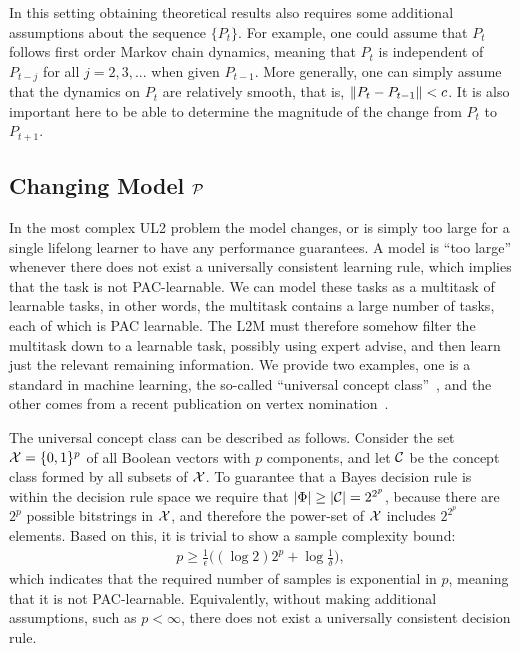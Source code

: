 \documentclass{article}
\begin{document}
In this setting obtaining theoretical results also requires some additional assumptions about the sequence $\{P_t\}$.
For example, one could assume that $P_t$ follows  first order Markov chain dynamics, meaning that $P_t$ is independent of $P_{t-j}$  for all $j=2,3,...$ when given $P_{t-1}$.  More generally, one can simply assume that the dynamics on $P_t$ are relatively smooth, that is, $\left \lVert P_t - P_{t-1} \right \rVert < c$. It is also important here to be able to determine the magnitude of the change from $P_t$ to $P_{t+1}$. 



\subsection{Changing Model $\mathcal{P}$}

In the most complex  UL2 problem  the model changes, or is simply too large for a single lifelong learner to have any performance guarantees. A model is ``too large'' whenever there does not exist a universally consistent learning rule, which implies that the task is not PAC-learnable. We can model these tasks as a multitask of learnable tasks, in other words, the multitask contains a large number of tasks, each of which is PAC learnable.  The L2M must therefore somehow filter the multitask down to a learnable task, possibly using expert advise, and then learn just the relevant remaining information.  We provide two examples, one is a standard in machine learning, the so-called ``universal concept class''~\cite{Mohri2018-tf}, and the other comes from a recent publication on vertex nomination~\cite{Lyzinski2017}.  

The universal concept class can be described as follows.  Consider the set $\mathcal{X}=\{0,1\}^p$ of all Boolean vectors with $p$ components, and let $\mathcal{C}$ be the concept class formed by all subsets of $\mathcal{X}$.  To guarantee that a Bayes decision rule is within the decision rule space we require that $|\Phi| \geq |\mathcal{C}| = 2^{2^p}$, because there are $2^p$ possible bitstrings in $\mathcal{X}$, and therefore the power-set of $\mathcal{X}$ includes $2^{2^p}$ elements.  Based on this, it is trivial to show a sample complexity bound:
\begin{align}
    p \geq \frac{1}{\epsilon} \big(  (\log 2) 2^p + \log \frac{1}{\delta} \big),
\end{align}
which indicates that the required number of samples is exponential in $p$, meaning that it is not PAC-learnable.  Equivalently, without making additional assumptions, such as $p < \infty$, there does not exist a universally consistent decision rule. 
\end{document}
